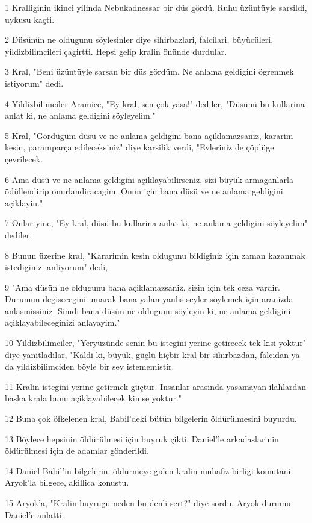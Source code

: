 \par 1 Kralliginin ikinci yilinda Nebukadnessar bir düs gördü. Ruhu üzüntüyle sarsildi, uykusu kaçti.
\par 2 Düsünün ne oldugunu söylesinler diye sihirbazlari, falcilari, büyücüleri, yildizbilimcileri çagirtti. Hepsi gelip kralin önünde durdular.
\par 3 Kral, "Beni üzüntüyle sarsan bir düs gördüm. Ne anlama geldigini ögrenmek istiyorum" dedi.
\par 4 Yildizbilimciler Aramice, "Ey kral, sen çok yasa!" dediler, "Düsünü bu kullarina anlat ki, ne anlama geldigini söyleyelim."
\par 5 Kral, "Gördügüm düsü ve ne anlama geldigini bana açiklamazsaniz, kararim kesin, paramparça edileceksiniz" diye karsilik verdi, "Evleriniz de çöplüge çevrilecek.
\par 6 Ama düsü ve ne anlama geldigini açiklayabilirseniz, sizi büyük armaganlarla ödüllendirip onurlandiracagim. Onun için bana düsü ve ne anlama geldigini açiklayin."
\par 7 Onlar yine, "Ey kral, düsü bu kullarina anlat ki, ne anlama geldigini söyleyelim" dediler.
\par 8 Bunun üzerine kral, "Kararimin kesin oldugunu bildiginiz için zaman kazanmak istediginizi anliyorum" dedi,
\par 9 "Ama düsün ne oldugunu bana açiklamazsaniz, sizin için tek ceza vardir. Durumun degisecegini umarak bana yalan yanlis seyler söylemek için aranizda anlasmissiniz. Simdi bana düsün ne oldugunu söyleyin ki, ne anlama geldigini açiklayabileceginizi anlayayim."
\par 10 Yildizbilimciler, "Yeryüzünde senin bu istegini yerine getirecek tek kisi yoktur" diye yanitladilar, "Kaldi ki, büyük, güçlü hiçbir kral bir sihirbazdan, falcidan ya da yildizbilimciden böyle bir sey istememistir.
\par 11 Kralin istegini yerine getirmek güçtür. Insanlar arasinda yasamayan ilahlardan baska krala bunu açiklayabilecek kimse yoktur."
\par 12 Buna çok öfkelenen kral, Babil'deki bütün bilgelerin öldürülmesini buyurdu.
\par 13 Böylece hepsinin öldürülmesi için buyruk çikti. Daniel'le arkadaslarinin öldürülmesi için de adamlar gönderildi.
\par 14 Daniel Babil'in bilgelerini öldürmeye giden kralin muhafiz birligi komutani Aryok'la bilgece, akillica konustu.
\par 15 Aryok'a, "Kralin buyrugu neden bu denli sert?" diye sordu. Aryok durumu Daniel'e anlatti.
